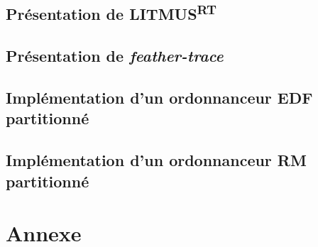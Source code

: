 \documentclass{article}
\newcommand{\litmus}{LITMUS\textsuperscript{RT}}
\begin{document}
    \subsection{Présentation de \litmus}
    
    
    
    \subsection{Présentation de \textit{feather-trace}}
    


    \subsection{Implémentation d'un ordonnanceur EDF partitionné}
    
    
    
    \subsection{Implémentation d'un ordonnanceur RM partitionné}
    
    
    \newpage
    \section*{Annexe}
    

    \newpage
    \newpage
    \listoffigures
    
    \printnoidxglossaries %
\end{document}

